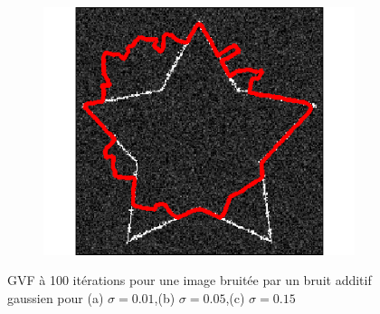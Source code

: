 \begin{appendices}
\begin{figure}[H]
\begin{subfigure}[c]{0.3\linewidth}
\includegraphics[width=\textwidth]{Chapters/Images/Noise/gvfg15}
\caption{}
\end{subfigure}
\caption{GVF à 100 itérations pour une image bruitée par un bruit additif gaussien pour (a) $\sigma = 0.01$,(b) $\sigma = 0.05$,(c) $\sigma = 0.15$}
\end{figure}


\end{appendices}

